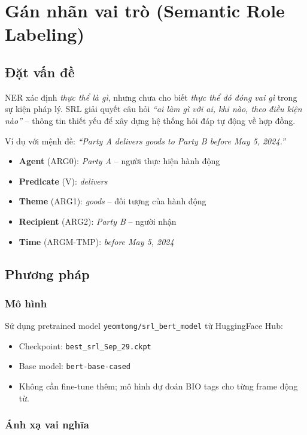 \section{Gán nhãn vai trò (Semantic Role Labeling)}

\subsection{Đặt vấn đề}

NER xác định \textit{thực thể là gì}, nhưng chưa cho biết \textit{thực thể đó đóng vai gì} trong sự kiện pháp lý. SRL giải quyết câu hỏi \textit{``ai làm gì với ai, khi nào, theo điều kiện nào''} -- thông tin thiết yếu để xây dựng hệ thống hỏi đáp tự động về hợp đồng.

Ví dụ với mệnh đề: \textit{``Party A delivers goods to Party B before May 5, 2024.''}
\begin{itemize}
    \item \textbf{Agent} (ARG0): \textit{Party A} -- người thực hiện hành động
    \item \textbf{Predicate} (V): \textit{delivers}
    \item \textbf{Theme} (ARG1): \textit{goods} -- đối tượng của hành động
    \item \textbf{Recipient} (ARG2): \textit{Party B} -- người nhận
    \item \textbf{Time} (ARGM-TMP): \textit{before May 5, 2024}
\end{itemize}

\subsection{Phương pháp}

\subsubsection{Mô hình}

Sử dụng pretrained model \texttt{yeomtong/srl\_bert\_model} từ HuggingFace Hub:
\begin{itemize}
    \item Checkpoint: \texttt{best\_srl\_Sep\_29.ckpt}
    \item Base model: \texttt{bert-base-cased}
    \item Không cần fine-tune thêm; mô hình dự đoán BIO tags cho từng frame động từ.
\end{itemize}

\subsubsection{Ánh xạ vai nghĩa}

